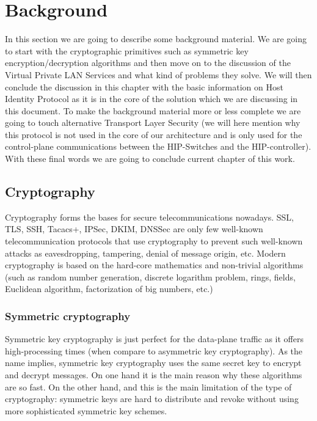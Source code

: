 \chapter{Background}
In this section we are going to describe some background 
material. We are going to start with the cryptographic primitives
such as symmetric key encryption/decryption algorithms and 
then move on to the discussion of the Virtual Private LAN 
Services and what kind of problems they solve. We will then
conclude the discussion in this chapter with the basic information
on Host Identity Protocol as it is in the core of the solution which we
are discussing in this document. To make the background material
more or less complete we are going to touch alternative 
Transport Layer Security (we will here mention why this 
protocol is not used in the core of our architecture and 
is only used for the control-plane communications between the 
HIP-Switches and the HIP-controller). With these final words
we are going to conclude current chapter of this work.

\section{Cryptography}
Cryptography forms the bases for secure telecommunications 
nowadays. SSL, TLS, SSH, Tacacs+, IPSec, DKIM, DNSSec are 
only few well-known telecommunication protocols that use 
cryptography to prevent such well-known attacks as 
eavesdropping, tampering, denial of message origin, etc. 
Modern cryptography is based on the hard-core 
mathematics and non-trivial algorithms (such as random number 
generation, discrete logarithm problem, rings, fields, 
Euclidean algorithm, factorization of big numbers, etc.)

\subsection{Symmetric cryptography}
Symmetric key cryptography is just perfect for the data-plane traffic
as it offers high-processing times (when compare to asymmetric key
cryptography). As the name implies, symmetric key cryptography uses
the same secret key to encrypt and decrypt messages. On one hand it is
the main reason why these algorithms are so fast. On the other hand, 
and this is the main limitation of the type of cryptography: 
symmetric keys are hard to distribute and revoke without using more
sophisticated symmetric key schemes. 

